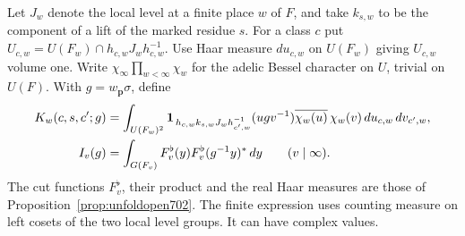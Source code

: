 \documentclass[a4paper,11pt]{article}
\theoremstyle{definition}
\theoremstyle{remark}
\numberwithin{equation}{section}
\begin{document}
Let \(J_w\) denote the local level at a finite place \(w\) of
\(F\), and take \(k_{s,w}\) to be the component of a lift of
the marked residue \(s\). For a class \(c\) put
\(U_{c,w}=U(F_w)\cap h_{c,w}J_wh_{c,w}^{-1}\).
Use Haar measure \(du_{c,w}\) on \(U(F_w)\) giving \(U_{c,w}\)
volume one. Write \(\chi_\infty\prod_{w<\infty}\chi_w\) for
the adelic Bessel character on \(U\), trivial on \(U(F)\).
With \(g=w_{\mathbf p}\sigma\), define
\begin{align*}
 K_w(c,s,c';g)
    &=\int_{U(F_w)^2}
         {\bf1}_{\,h_{c,w}k_{s,w}J_w h_{c',w}^{-1}}(u g v^{-1})
           \overline{\chi_w(u)}\,\chi_w(v)\,du_{c,w}\,dv_{c',w},\\
 I_v(g)
    &=\int_{G(F_v)} F_v^\flat(y)F_v^\flat(g^{-1}y)^*\,dy
              \qquad (v\mid\infty).
\end{align*}
The cut functions \(F_v^\flat\), their product and the real Haar
measures are those of Proposition~\ref{prop:unfoldopen702}.
The finite expression uses counting measure on left cosets of
the two local level groups. It can have complex values.
\end{document}
